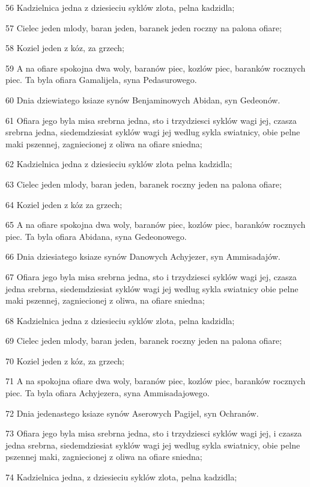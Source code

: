 \par 56 Kadzielnica jedna z dziesieciu syklów zlota, pelna kadzidla;
\par 57 Cielec jeden mlody, baran jeden, baranek jeden roczny na palona ofiare;
\par 58 Koziel jeden z kóz, za grzech;
\par 59 A na ofiare spokojna dwa woly, baranów piec, kozlów piec, baranków rocznych piec. Ta byla ofiara Gamalijela, syna Pedasurowego.
\par 60 Dnia dziewiatego ksiaze synów Benjaminowych Abidan, syn Gedeonów.
\par 61 Ofiara jego byla misa srebrna jedna, sto i trzydziesci syklów wagi jej, czasza srebrna jedna, siedemdziesiat syklów wagi jej wedlug sykla swiatnicy, obie pelne maki pszennej, zagniecionej z oliwa na ofiare sniedna;
\par 62 Kadzielnica jedna z dziesieciu syklów zlota pelna kadzidla;
\par 63 Cielec jeden mlody, baran jeden, baranek roczny jeden na palona ofiare;
\par 64 Koziel jeden z kóz za grzech;
\par 65 A na ofiare spokojna dwa woly, baranów piec, kozlów piec, baranków rocznych piec. Ta byla ofiara Abidana, syna Gedeonowego.
\par 66 Dnia dziesiatego ksiaze synów Danowych Achyjezer, syn Ammisadajów.
\par 67 Ofiara jego byla misa srebrna jedna, sto i trzydziesci syklów wagi jej, czasza jedna srebrna, siedemdziesiat syklów wagi jej wedlug sykla swiatnicy obie pelne maki pszennej, zagniecionej z oliwa, na ofiare sniedna;
\par 68 Kadzielnica jedna z dziesieciu syklów zlota, pelna kadzidla;
\par 69 Cielec jeden mlody, baran jeden, baranek roczny jeden na palona ofiare;
\par 70 Koziel jeden z kóz, za grzech;
\par 71 A na spokojna ofiare dwa woly, baranów piec, kozlów piec, baranków rocznych piec. Ta byla ofiara Achyjezera, syna Ammisadajowego.
\par 72 Dnia jedenastego ksiaze synów Aserowych Pagijel, syn Ochranów.
\par 73 Ofiara jego byla misa srebrna jedna, sto i trzydziesci syklów wagi jej, i czasza jedna srebrna, siedemdziesiat syklów wagi jej wedlug sykla swiatnicy, obie pelne pszennej maki, zagniecionej z oliwa na ofiare sniedna;
\par 74 Kadzielnica jedna, z dziesieciu syklów zlota, pelna kadzidla;
